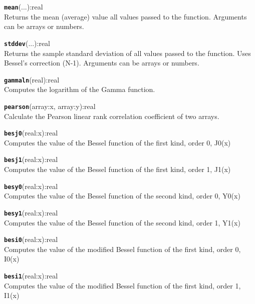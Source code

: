 \texttt{{\large\textbf{mean}}}\textsf{(...):real}\\
 Returns the mean (average) value all values passed to the function. Arguments can be arrays or numbers.

\hrulefill

\texttt{{\large\textbf{stddev}}}\textsf{(...):real}\\
 Returns the sample standard deviation of all values passed to the function. Uses Bessel's correction (N-1). Arguments can be arrays or numbers.

\hrulefill

\texttt{{\large\textbf{gammaln}}}\textsf{(real):real}\\
 Computes the logarithm of the Gamma function.

\hrulefill

\texttt{{\large\textbf{pearson}}}\textsf{(array:x, array:y):real}\\
 Calculate the Pearson linear rank correlation coefficient of two arrays.

\hrulefill

\texttt{{\large\textbf{besj0}}}\textsf{(real:x):real}\\
 Computes the value of the Bessel function of the first kind, order 0, J0(x)

\hrulefill

\texttt{{\large\textbf{besj1}}}\textsf{(real:x):real}\\
 Computes the value of the Bessel function of the first kind, order 1, J1(x)

\hrulefill

\texttt{{\large\textbf{besy0}}}\textsf{(real:x):real}\\
 Computes the value of the Bessel function of the second kind, order 0, Y0(x)

\hrulefill

\texttt{{\large\textbf{besy1}}}\textsf{(real:x):real}\\
 Computes the value of the Bessel function of the second kind, order 1, Y1(x)

\hrulefill

\texttt{{\large\textbf{besi0}}}\textsf{(real:x):real}\\
 Computes the value of the modified Bessel function of the first kind, order 0, I0(x)

\hrulefill

\texttt{{\large\textbf{besi1}}}\textsf{(real:x):real}\\
 Computes the value of the modified Bessel function of the first kind, order 1, I1(x)

